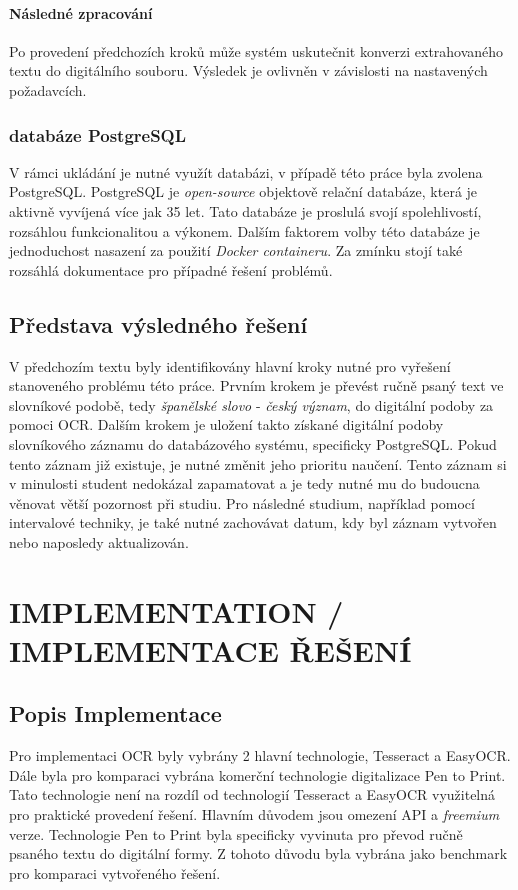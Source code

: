 \documentclass[journal]{IEEEtran}
\begin{document}
\paragraph{Následné zpracování}
Po provedení předchozích kroků může systém uskutečnit konverzi extrahovaného textu do digitálního souboru.
Výsledek je ovlivněn v závislosti na nastavených požadavcích.

\subsubsection{databáze PostgreSQL}
V rámci ukládání je nutné využít databázi, v případě této práce byla zvolena PostgreSQL\@.
PostgreSQL je \textit{open-source} objektově relační databáze, která je aktivně vyvíjená více jak 35 let.
Tato databáze je proslulá svojí spolehlivostí, rozsáhlou funkcionalitou a výkonem.
Dalším faktorem volby této databáze je jednoduchost nasazení za použití \textit{Docker containeru}.
Za zmínku stojí také rozsáhlá dokumentace pro případné řešení problémů.\cite{postgre}

\subsection{Představa výsledného řešení}
V předchozím textu byly identifikovány hlavní kroky nutné pro vyřešení stanoveného problému této práce.
Prvním krokem je převést ručně psaný text ve slovníkové podobě, tedy \textit{španělské slovo} - \textit{český význam}, do digitální podoby za pomoci \ac{OCR}.
Dalším krokem je uložení takto získané digitální podoby slovníkového záznamu do databázového systému, specificky PostgreSQL\@.
Pokud tento záznam již existuje, je nutné změnit jeho prioritu naučení.
Tento záznam si v minulosti student nedokázal zapamatovat a je tedy nutné mu do budoucna věnovat větší pozornost při studiu.
Pro následné studium, například pomocí intervalové techniky, je také nutné zachovávat datum, kdy byl záznam vytvořen nebo naposledy aktualizován.


\section{IMPLEMENTATION / IMPLEMENTACE ŘEŠENÍ}

\subsection{Popis Implementace}
Pro implementaci \ac{OCR} byly vybrány 2 hlavní technologie, Tesseract\cite{tesseract} a EasyOCR\cite{easy_ocr}.
Dále byla pro komparaci vybrána komerční technologie digitalizace Pen to Print\cite{pen_to_print}.
Tato technologie není na rozdíl od technologií Tesseract a EasyOCR využitelná pro praktické provedení řešení.
Hlavním důvodem jsou omezení \ac{API} a \textit{freemium} verze.
Technologie Pen to Print byla specificky vyvinuta pro převod ručně psaného textu do digitální formy.
Z tohoto důvodu byla vybrána jako benchmark pro komparaci vytvořeného řešení.
\end{document}
